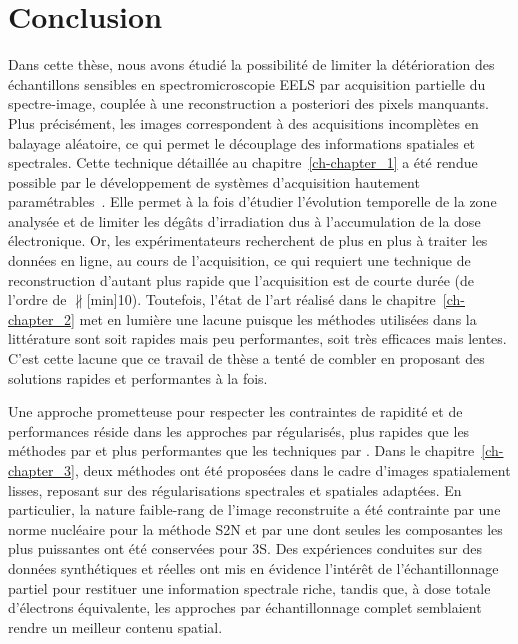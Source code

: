 \chapter*{Conclusion}\label{chap-conclusion}

Dans cette thèse, nous avons étudié la possibilité de limiter la détérioration des échantillons sensibles en spectromicroscopie EELS par acquisition partielle du spectre-image, couplée à une reconstruction a posteriori des pixels manquants. 
%
Plus précisément, les images correspondent à des acquisitions incomplètes en balayage aléatoire, ce qui permet le découplage des informations spatiales et spectrales.
%
Cette technique détaillée au chapitre~\ref{ch-chapter_1} a été rendue possible par le développement de systèmes d'acquisition hautement paramétrables~\cite{tararan2016random, zobelli2019spatial, tence2019following}. Elle permet à la fois d'étudier l'évolution temporelle de la zone analysée et de limiter les dégâts d'irradiation dus à l'accumulation de la dose électronique.
%
Or, les expérimentateurs recherchent de plus en plus à traiter les données en ligne, \ie{} au cours de l'acquisition, ce qui requiert une technique de reconstruction d'autant plus rapide que l'acquisition est de courte durée (de l'ordre de $\nparallel$[min]{10}). Toutefois, l'état de l'art réalisé dans le chapitre~\ref{ch-chapter_2} met en lumière une lacune puisque les méthodes utilisées dans la littérature sont soit rapides mais peu performantes, soit très efficaces mais lentes. C'est cette lacune que ce travail de thèse a tenté de combler en proposant des solutions rapides et performantes à la fois.

Une approche prometteuse pour respecter les contraintes de rapidité et de performances réside dans les approches par  régularisés, plus rapides que les méthodes par  et plus performantes que les techniques par . Dans le chapitre~\ref{ch-chapter_3}, deux méthodes ont été proposées dans le cadre d'images spatialement lisses, reposant sur des régularisations spectrales et spatiales adaptées. 
%
En particulier, la nature faible-rang de l'image reconstruite a été contrainte par une norme nucléaire pour la méthode S2N et par une  dont seules les composantes les plus puissantes ont été conservées pour 3S.
%
Des expériences conduites sur des données synthétiques et réelles ont mis en évidence l'intérêt de l'échantillonnage partiel pour restituer une information spectrale riche, tandis que, à dose totale d'électrons équivalente, les approches par échantillonnage complet semblaient rendre un meilleur contenu spatial.

